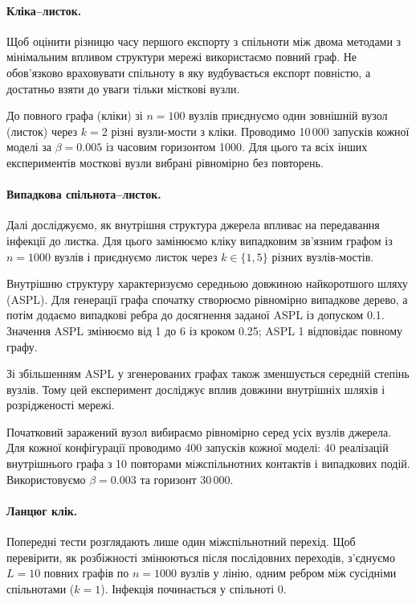 \documentclass[a4paper,fleqn]{cas-sc}
\begin{document}
\paragraph{Кліка--листок.}
Щоб оцінити різницю часу першого експорту з спільноти між двома методами з мінімальним впливом структури мережі використаємо повний граф. Не обов'язково враховувати спільноту в яку вудбувається експорт повністю, а достатньо взяти до уваги тільки місткові вузли.

До повного графа (кліки) зі $n=100$ вузлів приєднуємо
один зовнішній вузол (листок) через $k=2$
різні вузли-мости з кліки.  Проводимо 10\,000 запусків кожної моделі
за $\beta=0.005$ із часовим горизонтом 1000. Для цього та всіх інших експериментів мосткові вузли вибрані рівномірно
без повторень.

\paragraph{Випадкова спільнота--листок.}
Далі досліджуємо, як внутрішня структура
джерела впливає на передавання інфекції
до листка. Для цього замінюємо кліку
випадковим зв'язним графом із $n=1000$
вузлів і приєднуємо листок через
$k\in\{1,5\}$ різних вузлів-мостів.

Внутрішню структуру характеризуємо
середньою довжиною найкоротшого шляху (ASPL).
Для генерації графа спочатку створюємо
рівномірно випадкове дерево, а потім додаємо
випадкові ребра до досягнення заданої ASPL
із допуском 0.1. Значення ASPL змінюємо
від 1 до 6 із кроком 0.25;
ASPL 1 відповідає повному графу.

Зі збільшенням ASPL у згенерованих графах
також зменшується середній степінь вузлів.
Тому цей експеримент досліджує 
вплив довжини внутрішніх шляхів
і розрідженості мережі.


Початковий заражений вузол вибираємо
рівномірно серед усіх вузлів джерела.
Для кожної конфігурації проводимо
400 запусків кожної моделі:
40 реалізацій внутрішнього графа
з 10 повторами міжспільнотних контактів
і випадкових подій.
Використовуємо $\beta=0.003$
та горизонт 30\,000.




\paragraph{Ланцюг клік.}
Попередні тести розглядають лише один
міжспільнотний перехід. Щоб перевірити,
як розбіжності змінюються після
послідовних переходів, з'єднуємо
$L=10$ повних графів по $n=1000$ вузлів
у лінію, одним ребром між сусідніми
спільнотами ($k=1$).
Інфекція починається у спільноті 0.
\end{document}
